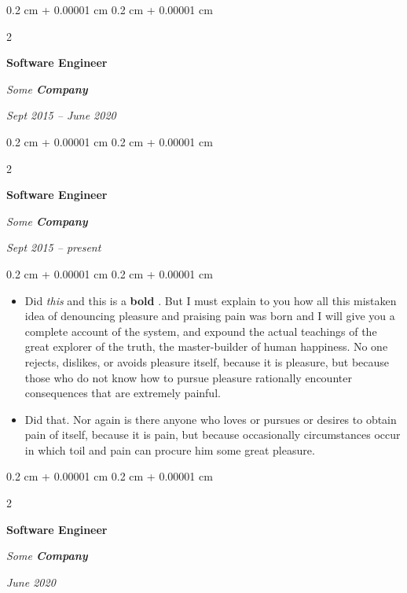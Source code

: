 \documentclass[10pt, letterpaper]{article}
\newenvironment{highlights}{
    \begin{itemize}[
        topsep=0.10 cm,
        parsep=0.10 cm,
        partopsep=0pt,
        itemsep=0pt,
        leftmargin=0.4 cm + 10pt
    ]
}{
    \end{itemize}
} %
\newenvironment{onecolentry}{
    \begin{adjustwidth}{
        0.2 cm + 0.00001 cm
    }{
        0.2 cm + 0.00001 cm
    }
}{
    \end{adjustwidth}
} %
\newenvironment{twocolentry}[2][]{
    \onecolentry
    \def\secondColumn{#2}
    \setcolumnwidth{\fill, 4.5 cm}
    \begin{paracol}{2}
}{
    \switchcolumn \raggedleft \secondColumn
    \end{paracol}
    \endonecolentry
} %
\let\hrefWithoutArrow\href
\renewcommand{\href}[2]{\hrefWithoutArrow{#1}{\ifthenelse{\equal{#2}{}}{ }{#2 }\raisebox{.15ex}{\footnotesize \faExternalLink*}}}
\begin{document}
        \vspace{0.2 cm}

            \begin{twocolentry}{


        \textit{Sept 2015 – June 2020}    }
                \textbf{Software Engineer}

                \textit{Some \textbf{Company}}
            \end{twocolentry}



        \vspace{0.2 cm}

            \begin{twocolentry}{


        \textit{Sept 2015 – present}    }
                \textbf{Software Engineer}

                \textit{Some \textbf{Company}}
            \end{twocolentry}

        \vspace{0.10 cm}
        \begin{onecolentry}
            \begin{highlights}
                \item Did \textit{this} and this is a \textbf{bold} \href{https://example.com}{link}. But I must explain to you how all this mistaken idea of denouncing pleasure and praising pain was born and I will give you a complete account of the system, and expound the actual teachings of the great explorer of the truth, the master-builder of human happiness. No one rejects, dislikes, or avoids pleasure itself, because it is pleasure, but because those who do not know how to pursue pleasure rationally encounter consequences that are extremely painful.
                \item Did that. Nor again is there anyone who loves or pursues or desires to obtain pain of itself, because it is pain, but because occasionally circumstances occur in which toil and pain can procure him some great pleasure.
            \end{highlights}
        \end{onecolentry}


        \vspace{0.2 cm}

            \begin{twocolentry}{


        \textit{June 2020}    }
                \textbf{Software Engineer}

                \textit{Some \textbf{Company}}
            \end{twocolentry}
\end{document}
